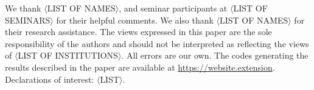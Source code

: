 \protect\linespread{1}\protect\selectfont
We thank \(\langle\)LIST OF NAMES\(\rangle\), and seminar participants at \(\langle\)LIST OF SEMINARS\(\rangle\) for their helpful comments. We also thank \(\langle\)LIST OF NAMES\(\rangle\) for their research assistance. The views expressed in this paper are the sole responsibility of the authors and should not be interpreted as reflecting the views of \(\langle\)LIST OF INSTITUTIONS\(\rangle\). All errors are our own. The codes generating the results described in the paper are available at \url{https://website.extension}. Declarations of interest: \(\langle\)LIST\(\rangle\).
